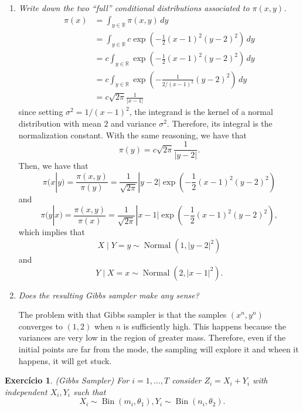 \documentclass[a4paper,12pt]{article}
\newcommand{\R}{\mathbb{R}}
\newcommand{\bin}{\operatorname{Bin}}
\newtheorem{exercise}{Exercício}
\theoremstyle{definition}
\begin{document}
\begin{enumerate}
    \item {\it Write down the two ``full'' conditional distributions associated to $\pi(x, y)$.}
    \begin{equation*}
        \begin{split}
            \pi(x) &= \int_{y \in \R} \pi(x,y) \, dy\\
            &= \int_{y \in \R} c\exp\left(-\frac{1}{2}(x-1)^2(y-2)^2\right)\,dy \\
            &= c\int_{y \in \R} \exp\left(-\frac{1}{2}(x-1)^2(y-2)^2\right)\,dy \\
            &= c\int_{y \in \R} \exp\left(-\frac{1}{2/(x-1)^2} (y-2)^2\right)\,dy \\
            &= c\sqrt{2\pi}\frac{1}{|x - 1|}
        \end{split}
    \end{equation*}
    since setting $\sigma^2 = 1/(x-1)^2$, the integrand is the kernel of a
    normal distribution with mean $2$ and variance $\sigma^2$. Therefore, its
    integral is the normalization constant. With the same reasoning, we have
    that 
    $$
    \pi(y) = c\sqrt{2\pi}\frac{1}{|y-2|}.
    $$
    Then, we have that 
    $$
    \pi(x|y) = \frac{\pi(x,y)}{\pi(y)} = \frac{1}{\sqrt{2\pi}}|y-2|\exp\left(-\frac{1}{2}(x-1)^2(y-2)^2\right) 
    $$
    and 
    $$
    \pi(y|x) = \frac{\pi(x,y)}{\pi(x)} = \frac{1}{\sqrt{2\pi}}|x-1|\exp\left(-\frac{1}{2}(x-1)^2(y-2)^2\right),
    $$
    which implies that 
    $$
    X \mid Y = y \sim \operatorname{Normal}(1, |y-2|^2)
    $$
    and 
    $$
    Y \mid X = x \sim \operatorname{Normal}(2, |x-1|^2).
    $$ 
    
    \item {\it Does the resulting Gibbs sampler make any sense?}
    
    The problem with that Gibbs sampler is that the samples $(x^n, y^n)$
    converges to $(1,2)$ when $n$ is sufficiently high. This happens because
    the variances are very low in the region of greater mass. Therefore, even
    if the initial points are far from the mode, the sampling will explore it
    and wheen it happens, it will get stuck. 
\end{enumerate}

\begin{exercise}
    (Gibbs Sampler)
    For $i = 1, \dots , T$ consider $Z_i = X_i + Y_i$ with independent $X_i,
    Y_i$ such that
    $$
    X_i \sim \bin(m_i , \theta_1), Y_i \sim \bin(n_i, \theta_2).
    $$
\end{exercise}
\end{document}
